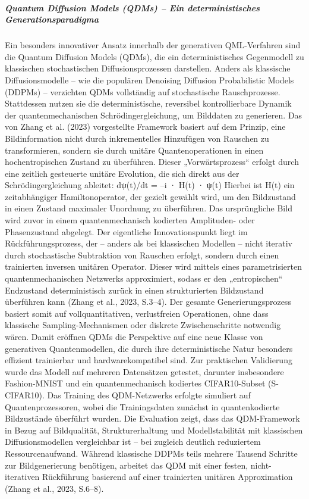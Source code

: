 \subparagraph{Quantum Diffusion Models (QDMs) – Ein deterministisches Generationsparadigma}
Ein besonders innovativer Ansatz innerhalb der generativen QML-Verfahren sind die Quantum Diffusion Models (QDMs), die ein deterministisches Gegenmodell zu klassischen stochastischen Diffusionsprozessen darstellen. Anders als klassische Diffusionsmodelle – wie die populären Denoising Diffusion Probabilistic Models (DDPMs) – verzichten QDMs vollständig auf stochastische Rauschprozesse. Stattdessen nutzen sie die deterministische, reversibel kontrollierbare Dynamik der quantenmechanischen Schrödingergleichung, um Bilddaten zu generieren.
Das von Zhang et al. (2023) vorgestellte Framework basiert auf dem Prinzip, eine Bildinformation nicht durch inkrementelles Hinzufügen von Rauschen zu transformieren, sondern sie durch unitäre Quantenoperationen in einen hochentropischen Zustand zu überführen. Dieser „Vorwärtsprozess“ erfolgt durch eine zeitlich gesteuerte unitäre Evolution, die sich direkt aus der Schrödingergleichung ableitet:
dψ(t)/dt = –i · H(t) · ψ(t) 
Hierbei ist H(t) ein zeitabhängiger Hamiltonoperator, der gezielt gewählt wird, um den Bildzustand in einen Zustand maximaler Unordnung zu überführen. Das ursprüngliche Bild wird zuvor in einem quantenmechanisch kodierten Amplituden- oder Phasenzustand abgelegt.
Der eigentliche Innovationspunkt liegt im Rückführungsprozess, der – anders als bei klassischen Modellen – nicht iterativ durch stochastische Subtraktion von Rauschen erfolgt, sondern durch einen trainierten inversen unitären Operator. Dieser wird mittels eines parametrisierten quantenmechanischen Netzwerks approximiert, sodass er den „entropischen“ Endzustand deterministisch zurück in einen strukturierten Bildzustand überführen kann (Zhang et al., 2023, S.3–4).
Der gesamte Generierungsprozess basiert somit auf vollquantitativen, verlustfreien Operationen, ohne dass klassische Sampling-Mechanismen oder diskrete Zwischenschritte notwendig wären. Damit eröffnen QDMs die Perspektive auf eine neue Klasse von generativen Quantenmodellen, die durch ihre deterministische Natur besonders effizient trainierbar und hardwarekompatibel sind.
Zur praktischen Validierung wurde das Modell auf mehreren Datensätzen getestet, darunter insbesondere Fashion-MNIST und ein quantenmechanisch kodiertes CIFAR10-Subset (S-CIFAR10). Das Training des QDM-Netzwerks erfolgte simuliert auf Quantenprozessoren, wobei die Trainingsdaten zunächst in quantenkodierte Bildzustände überführt wurden.
Die Evaluation zeigt, dass das QDM-Framework in Bezug auf Bildqualität, Strukturerhaltung und Modellstabilität mit klassischen Diffusionsmodellen vergleichbar ist – bei zugleich deutlich reduziertem Ressourcenaufwand. Während klassische DDPMs teils mehrere Tausend Schritte zur Bildgenerierung benötigen, arbeitet das QDM mit einer festen, nicht-iterativen Rückführung basierend auf einer trainierten unitären Approximation (Zhang et al., 2023, S.6–8).
